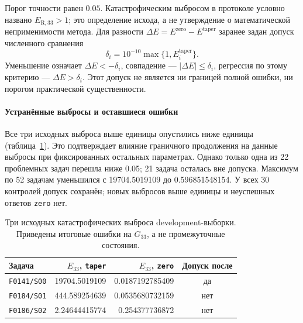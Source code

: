 \documentclass[14pt,a4paper]{extarticle}
\DeclareRobustCommand{\code}[1]{\texttt{\let\savedunderscore\_\def\_{\savedunderscore\allowbreak}#1}}
\begin{document}
Порог точности равен $0.05$. Катастрофическим выбросом в протоколе
условно названо $E_{\mathrm{R},33}>1$; это определение исхода,
а не утверждение о математической неприменимости метода.
Для разности $\Delta E=E^{\mathrm{zero}}-E^{\mathrm{taper}}$
заранее задан допуск численного сравнения
\[
\delta_i=10^{-10}\max\{1,E_i^{\mathrm{taper}}\}.
\]
Уменьшение означает $\Delta E<-\delta_i$, совпадение ---
$|\Delta E|\le\delta_i$, регрессия по этому критерию ---
$\Delta E>\delta_i$. Этот допуск не является ни границей полной ошибки,
ни порогом практической существенности.

\begin{table}[!htbp]
\centering
\caption{Результат замены \code{taper} на \code{zero}.
Уменьшения, совпадения и регрессии определены с допуском $\delta_i$.
Столбцы с парой значений относятся к исходному и новому продолжению.}
\label{tab:boundarydev-groups}
\end{table}

\paragraph{Устранённые выбросы и оставшиеся ошибки\\}
Все три исходных выброса выше единицы опустились ниже единицы
(таблица~\ref{tab:boundarydev-extremes}). Это подтверждает влияние
граничного продолжения на данные выбросы при фиксированных остальных
параметрах. Однако только одна из 22 проблемных задач перешла ниже 0.05;
21 задача осталась вне допуска. Максимум по 52 задачам уменьшился
с 19704.5019109 до 0.596851548154. У всех 30 контролей допуск сохранён;
новых выбросов выше единицы и неуспешных ответов \code{zero} нет.

\begin{table}[!htbp]
\centering
\caption{Три исходных катастрофических выброса development-выборки.
Приведены итоговые ошибки на $G_{33}$, а не промежуточные состояния.}
\label{tab:boundarydev-extremes}
\small
\begin{tabular}{lrrc}
\toprule
Задача & $E_{33}$, \code{taper} & $E_{33}$, \code{zero}
 & Допуск после\\
\midrule
\code{F0141/S00} & 19704.5019109 & 0.0187192785409 & да\\
\code{F0184/S01} & 444.589254639 & 0.0535680732159 & нет\\
\code{F0186/S02} & 2.24644415774 & 0.254377736872 & нет\\
\bottomrule
\end{tabular}
\end{table}
\end{document}
